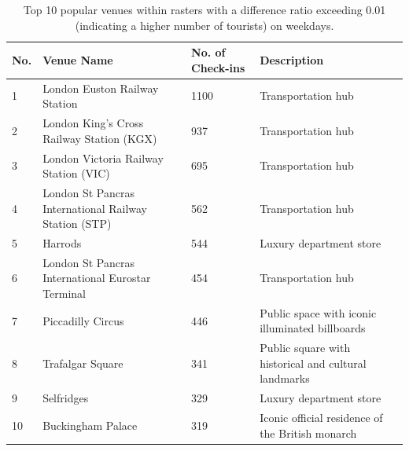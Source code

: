 \documentclass{article}
\theoremstyle{remark}
\begin{document}
\begin{table}[!h]
\centering
\caption{\label{tab:popular_venues_touristspop_weekday}Top 10 popular venues within rasters with a difference ratio exceeding 0.01 (indicating a higher number of tourists) on weekdays.}
\begin{adjustbox}{max width=\textwidth, margin=0cm}
\begin{threeparttable}
\begin{tabular}{lp{5cm}lp{4cm}} \hline
No. & Venue Name & No. of Check-ins & Description \\ \hline
1 & London Euston Railway Station & 1100 & Transportation hub \\
2 & London King's Cross Railway Station (KGX) & 937 & Transportation hub \\
3 & London Victoria Railway Station (VIC) & 695 & Transportation hub \\
4 & London St Pancras International Railway Station (STP) & 562 & Transportation hub \\
5 & Harrods & 544 & Luxury department store \\
6 & London St Pancras International Eurostar Terminal & 454 & Transportation hub \\
7 & Piccadilly Circus & 446 & Public space with iconic illuminated billboards \\
8 & Trafalgar Square & 341 & Public square with historical and cultural landmarks \\
9 & Selfridges & 329 & Luxury department store \\
10 & Buckingham Palace & 319 & Iconic official residence of the British monarch \\ \hline
\end{tabular}
\end{threeparttable}
\end{adjustbox}
\end{table}
\end{document}
